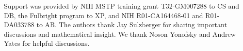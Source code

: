 Support was provided by NIH MSTP training grant T32-GM007288 to CS and DB, the Fulbright program to XP, and NIH R01-CA164468-01 and R01-DA033788 to AB. The authors thank Jay Sulzberger for sharing important discussions and mathematical insight. We thank Noson Yonofsky and Andrew Yates for helpful discussions.
